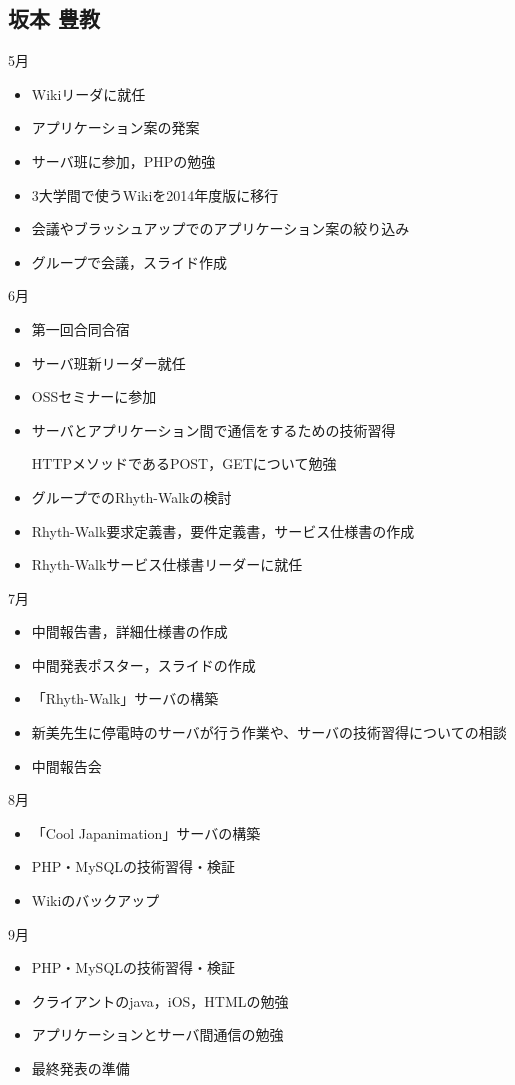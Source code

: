 \subsection{坂本 豊教}
5月
\begin{itemize}
\item Wikiリーダに就任
\item アプリケーション案の発案
\item サーバ班に参加，PHPの勉強
\item 3大学間で使うWikiを2014年度版に移行
\item 会議やブラッシュアップでのアプリケーション案の絞り込み
\item グループで会議，スライド作成
\end{itemize}
6月
\begin{itemize}
\item 第一回合同合宿
\item サーバ班新リーダー就任
\item OSSセミナーに参加
\item サーバとアプリケーション間で通信をするための技術習得
\par  HTTPメソッドであるPOST，GETについて勉強
\item グループでのRhyth-Walkの検討
\item Rhyth-Walk要求定義書，要件定義書，サービス仕様書の作成
\item Rhyth-Walkサービス仕様書リーダーに就任
\end{itemize}
7月
\begin{itemize}
\item 中間報告書，詳細仕様書の作成
\item 中間発表ポスター，スライドの作成
\item 「Rhyth-Walk」サーバの構築
\item 新美先生に停電時のサーバが行う作業や、サーバの技術習得についての相談
\item 中間報告会
\end{itemize}
8月
\begin{itemize}
\item 「Cool Japanimation」サーバの構築
\item PHP・MySQLの技術習得・検証
\item Wikiのバックアップ
\end{itemize}
9月
\begin{itemize}
\item PHP・MySQLの技術習得・検証
\item クライアントのjava，iOS，HTMLの勉強
\item アプリケーションとサーバ間通信の勉強
\item 最終発表の準備
\end{itemize}
